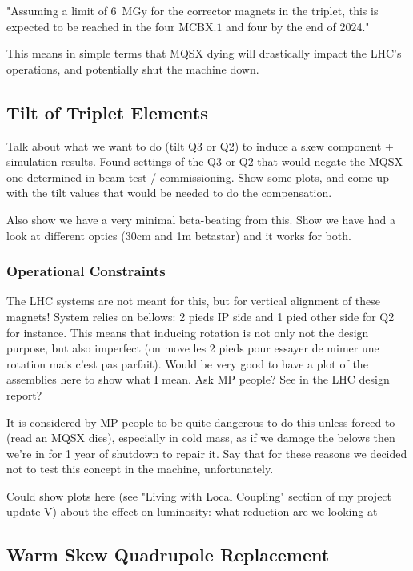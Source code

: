 "Assuming a limit of \qty{6}{\mega\gray} for the corrector magnets in the triplet, this is expected to be reached in the four \(\mathrm{MCBX.1}\) and four \MQSX by the end of \num{2024}."

This means in simple terms that MQSX dying will drastically impact the LHC's operations, and potentially shut the machine down.

\subsection{Tilt of Triplet Elements}

Talk about what we want to do (tilt Q3 or Q2) to induce a skew component + simulation results.
Found settings of the Q3 or Q2 that would negate the MQSX one determined in beam test / commissioning.
Show some plots, and come up with the tilt values that would be needed to do the compensation.

Also show we have a very minimal beta-beating from this.
Show we have had a look at different optics (30cm and 1m betastar) and it works for both.

\subsubsection{Operational Constraints}

The LHC systems are not meant for this, but for vertical alignment of these magnets!
System relies on bellows: 2 pieds IP side and 1 pied other side for Q2 for instance.
This means that inducing rotation is not only not the design purpose, but also imperfect (on move les 2 pieds pour essayer de mimer une rotation mais c'est pas parfait).
Would be very good to have a plot of the assemblies here to show what I mean. Ask MP people? See in the LHC design report?

It is considered by MP people to be quite dangerous to do this unless forced to (read an MQSX dies), especially in cold mass, as if we damage the belows then we're in for 1 year of shutdown to repair it.
Say that for these reasons we decided not to test this concept in the machine, unfortunately.

Could show plots here (see "Living with Local Coupling" section of my project update V) about the effect on luminosity: what reduction are we looking at 

\subsection{Warm Skew Quadrupole Replacement}

